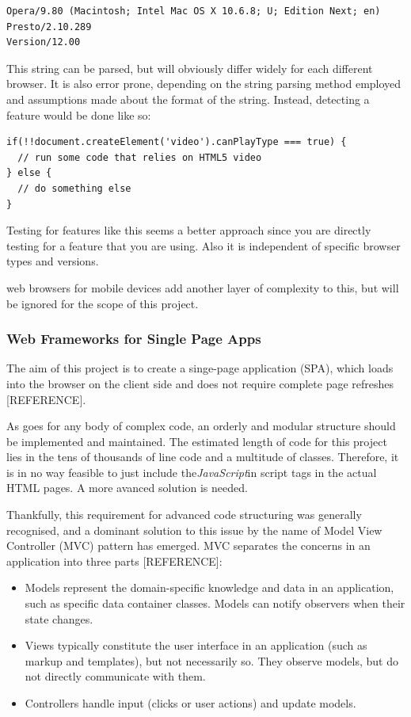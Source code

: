 \documentclass[a4paper,11pt,twoside]{article}
\begin{document}
\begin{verbatim}
Opera/9.80 (Macintosh; Intel Mac OS X 10.6.8; U; Edition Next; en) Presto/2.10.289 
Version/12.00
\end{verbatim}

This string can be parsed, but will obviously differ widely for each different browser. It is also error prone, depending on the string parsing method employed and assumptions made about the format of the string. Instead, detecting a feature would be done like so:
\begin{verbatim}
if(!!document.createElement('video').canPlayType === true) {
  // run some code that relies on HTML5 video
} else {
  // do something else
}
\end{verbatim}

Testing for features like this seems a better approach since you are directly testing for a feature that you are using. Also it is independent of specific browser types and versions.

web browsers for mobile devices add another layer of complexity to this, but will be ignored for the scope of this project.




\subsubsection{Web Frameworks for Single Page Apps}

The aim of this project is to create a singe-page application (SPA), which loads into the browser on the client side and does not require complete page refreshes [REFERENCE].

As goes for any body of complex code, an orderly and modular structure should be implemented and maintained. The estimated length of code for this project lies in the tens of thousands of line code and a multitude of classes. Therefore, it is in no way feasible to just include the\textit{JavaScript}in script tags in the actual HTML pages. A more avanced solution is needed.

Thankfully, this requirement for advanced code structuring was generally recognised, and a dominant solution to this issue by the name of Model View Controller (MVC) pattern has emerged. MVC separates the concerns in an application into three parts [REFERENCE]:

\begin{itemize}
\item Models represent the domain-specific knowledge and data in an application, such as specific data container classes. Models can notify observers when their state changes.
\item Views typically constitute the user interface in an application (such as markup and templates), but not necessarily so. They observe models, but do not directly communicate with them.
\item Controllers handle input (clicks or user actions) and update models.
\end{itemize}
\end{document}
